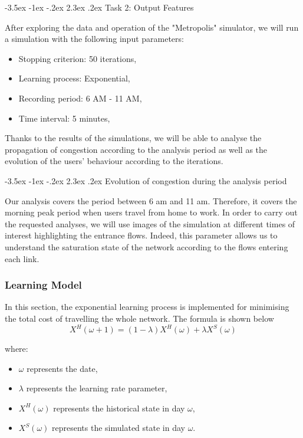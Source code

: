\documentclass[a4paper, 12pt,oneside]{article}
\makeatletter
\renewcommand{\section}{\@startsection {section}{1}{\z@}%
             {-3.5ex \@plus -1ex \@minus -.2ex}%
             {2.3ex \@plus.2ex}%
             {\normalfont\normalsize\bfseries}}
\renewcommand{\subsection}{\@startsection {subsection}{1}{\z@}%
             {-3.5ex \@plus -1ex \@minus -.2ex}%
             {2.3ex \@plus.2ex}%
             {\normalfont\normalsize\bfseries}}
\makeatother
\begin{document}
\section{Task 2: Output Features}

After exploring the data and operation of the "Metropolis" simulator, we will run a simulation with the following input parameters:

\begin{itemize}
    \item Stopping criterion: 50 iterations,
    \item Learning process: Exponential,
    \item Recording period: 6 AM - 11 AM,
    \item Time interval: 5 minutes,
\end{itemize}

Thanks to the results of the simulations, we will be able to analyse the propagation of congestion according to the analysis period as well as the evolution of the users' behaviour according to the iterations.

\subsection{Evolution of congestion during the analysis period}


Our analysis covers the period between 6 am and 11 am. Therefore, it covers the morning peak period when users travel from home to work. In order to carry out the requested analyses, we will use images of the simulation at different times of interest highlighting the entrance flows. Indeed, this parameter allows us to understand the saturation state of the network according to the flows entering each link.\\

\subsubsection{Learning Model}
In this section, the exponential learning process is implemented 
for minimising the total cost of travelling the whole network. The formula is shown below
\begin{equation}
    X^{H}(\omega+1) = (1-\lambda)X^{H}(\omega)+\lambda X^{S}(\omega)
\end{equation}

where:
\begin{itemize}
    \item $\omega$ represents the date,
    \item $\lambda$ represents the learning rate parameter,
    \item $X^{H}(\omega)$ represents the historical state in day $\omega$,
    \item $X^{S}(\omega)$ represents the simulated state in day $\omega$.
\end{itemize}
\end{document}

